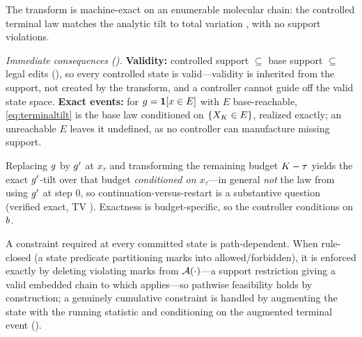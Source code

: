 The transform is machine-exact on an enumerable molecular chain: the controlled terminal law matches the
analytic tilt to total variation , with no support violations.

\emph{Immediate consequences ().} \textbf{Validity:} controlled support $\subseteq$ base
support $\subseteq$ legal edits (), so every controlled state is valid---validity is
inherited from the support, not created by the transform, and a controller cannot guide off the valid
state space. \textbf{Exact events:} for $g=\mathbf{1}[x\in E]$ with $E$ base-reachable,
\eqref{eq:terminaltilt} is the base law conditioned on $\{X_K\in E\}$, realized exactly; an
unreachable $E$ leaves it undefined, as no controller can manufacture missing support.

\begin{corollary}
\label{cor:dynamic}
Replacing $g$ by $g'$ at $x_\tau$ and transforming the remaining budget $K-\tau$ yields
the exact $g'$-tilt over that budget \emph{conditioned on $x_\tau$}---in general \emph{not} the law
from using $g'$ at step $0$, so continuation-versus-restart is a substantive question (verified
exact, TV ). Exactness is budget-specific, so the controller
conditions on $b$.
\end{corollary}

\begin{corollary}
\label{cor:pathwise}
A constraint required at every committed state is path-dependent. When rule-closed (a state predicate
partitioning marks into allowed/forbidden), it is enforced exactly by deleting violating marks from
$\mathcal{A}(\cdot)$---a support restriction giving a valid embedded chain to which  applies---so
pathwise feasibility holds by construction; a genuinely cumulative constraint is handled by augmenting the
state with the running statistic and conditioning on the augmented terminal event ().
\end{corollary}
